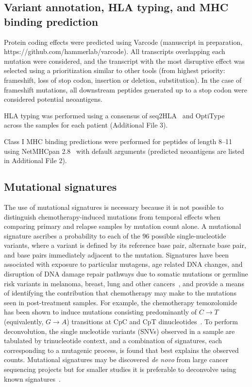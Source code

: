 \documentclass[linenumbers]{bmcart}
\begin{document}
\subsection*{Variant annotation, HLA typing, and MHC binding prediction}
\begin{sloppypar}
Protein coding effects were predicted using Varcode (manuscript in preparation, https://github.com/hammerlab/varcode). All transcripts overlapping each mutation were considered, and the transcript with the most disruptive effect was selected using a prioritization similar to other tools (from highest priority: frameshift, loss of stop codon, insertion or deletion, substitution). In the case of frameshift mutations, all downstream peptides generated up to a stop codon were considered potential neoantigens.

HLA typing was performed using a consensus of seq2HLA~\cite{Boegel_2012} and OptiType ~\cite{Szolek_2014} across the samples for each patient (Additional File 3).

Class I MHC binding predictions were performed for peptides of length 8--11 using NetMHCpan 2.8~\cite{Lundegaard_2008} with default arguments (predicted neoantigens are listed in Additional File 2).
\end{sloppypar}

\subsection*{Mutational signatures}
The use of mutational signatures is necessary because it is not possible to distinguish chemotherapy-induced mutations from temporal effects when comparing primary and relapse samples by mutation count alone. A mutational signature ascribes a probability to each of the 96 possible single-nucleotide variants, where a variant is defined by its reference base pair, alternate base pair, and base pairs immediately adjacent to the mutation. Signatures have been associated with exposure to particular mutagens, age related DNA changes, and disruption of DNA damage repair pathways due to somatic mutations or germline risk variants in melanoma, breast, lung and other cancers~\cite{Alexandrov2013}, and provide a means of identifying the contribution that chemotherapy may make to the mutations seen in post-treatment samples. For example, the chemotherapy temozolomide has been shown to induce mutations consisting predominantly of $C \rightarrow T$ (equivalently, $G \rightarrow A$) transitions at CpC and CpT dinucleotides~\cite{Johnson_2013}. To perform deconvolution, the single nucleotide variants (SNVs) observed in a sample are tabulated by trinucleotide context, and a combination of signatures, each corresponding to a mutagenic process, is found that best explains the observed counts. Mutational signatures may be discovered \textit{de novo} from large cancer sequencing projects but for smaller studies it is preferable to deconvolve using known signatures~\cite{Rosenthal_2016}.
\end{document}
